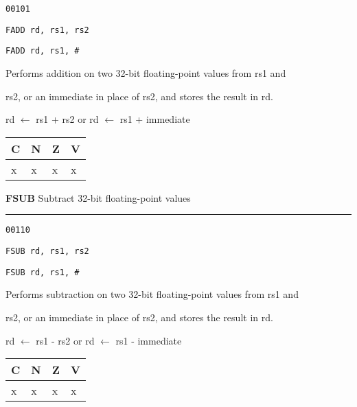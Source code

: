 \documentclass{article}
\begin{document}
{\large
	 \texttt{00101} \par
	\smallbreak
	 \texttt{FADD rd, rs1, rs2} \par
	\smallbreak
	 \texttt{FADD rd, rs1, \#<18-bit immediate>} \par
	\smallbreak
	 Performs addition on two 32-bit floating-point values from rs1 and \par
	\makebox[3.5cm][l]{  } rs2, or an immediate in place of rs2, and stores the result in rd. \par
	\smallbreak
	 rd $\leftarrow$ rs1 + rs2 \quad or \quad rd $\leftarrow$ rs1 + immediate\par
	\smallbreak
	 \begin{tabular}{llll} C \quad & N \quad & Z \quad & V \\ \hline x & x & x & x \\ \end{tabular}
}

\bigskip\bigskip

\flushleft
\LARGE\textbf{FSUB} \large \hfill Subtract 32-bit floating-point values

\kern-3pt
\noindent\rule{16.5cm}{0.4pt}
\normalsize

{\large
	 \texttt{00110} \par
	\smallbreak
	 \texttt{FSUB rd, rs1, rs2} \par
	\smallbreak
	 \texttt{FSUB rd, rs1, \#<18-bit immediate>} \par
	\smallbreak
	 Performs subtraction on two 32-bit floating-point values from rs1 and \par
	\makebox[3.5cm][l]{  } rs2, or an immediate in place of rs2, and stores the result in rd. \par
	\smallbreak
	 rd $\leftarrow$ rs1 - rs2 \quad or \quad rd $\leftarrow$ rs1 - immediate\par
	\smallbreak
	 \begin{tabular}{llll} C \quad & N \quad & Z \quad & V \\ \hline x & x & x & x \\ \end{tabular}
}
\end{document}
